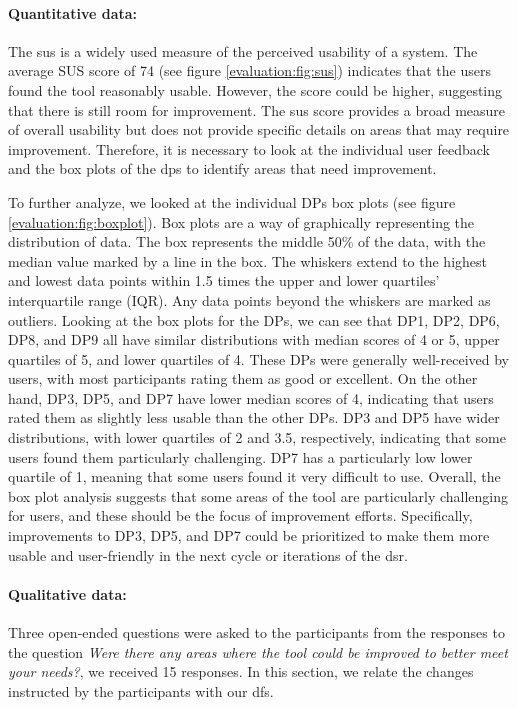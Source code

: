 \paragraph{Quantitative data:}
The \ac{sus} is a widely used measure of the perceived usability of a system. 
The average SUS score of 74 (see figure \ref{evaluation:fig:sus}) indicates that the users found the tool reasonably usable. 
However, the score could be higher, suggesting that there is still room for improvement. 
The \ac{sus} score provides a broad measure of overall usability but does not provide specific details on areas that may require improvement. 
Therefore, it is necessary to look at the individual user feedback and the box plots of the \ac{dp}s to identify areas that need improvement.

To further analyze, we looked at the individual DPs box plots (see figure \ref{evaluation:fig:boxplot}). 
Box plots are a way of graphically representing the distribution of data. 
The box represents the middle 50\% of the data, with the median value marked by a line in the box. 
The whiskers extend to the highest and lowest data points within 1.5 times the upper and lower quartiles' interquartile range (IQR). 
Any data points beyond the whiskers are marked as outliers.
Looking at the box plots for the DPs, we can see that DP1, DP2, DP6, DP8, and DP9 all have similar distributions with median scores of 4 or 5, upper quartiles of 5, and lower quartiles of 4. 
These DPs were generally well-received by users, with most participants rating them as good or excellent.
On the other hand, DP3, DP5, and DP7 have lower median scores of 4, indicating that users rated them as slightly less usable than the other DPs. 
DP3 and DP5 have wider distributions, with lower quartiles of 2 and 3.5, respectively, indicating that some users found them particularly challenging. 
DP7 has a particularly low lower quartile of 1, meaning that some users found it very difficult to use.
Overall, the box plot analysis suggests that some areas of the tool are particularly challenging for users, and these should be the focus of improvement efforts. 
Specifically, improvements to DP3, DP5, and DP7 could be prioritized to make them more usable and user-friendly in the next cycle or iterations of the \ac{dsr}.

\clearpage
\paragraph{Qualitative data:}
Three open-ended questions were asked to the participants from the responses to the question \textit{Were there any areas where the tool could be improved to better meet your needs?}, we received 15 responses.
In this section, we relate the changes instructed by the participants with our \ac{df}s.

